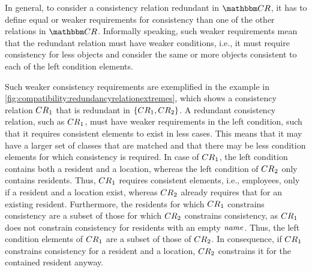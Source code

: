 In general, to consider a consistency relation redundant in $\consistencyrelationset{CR}$, it has to define equal or weaker requirements for consistency than one of the other relations in $\consistencyrelationset{CR}$.
Informally speaking, such weaker requirements mean that the redundant relation must have weaker conditions, i.e., it must require consistency for less objects and consider the same or more objects consistent to each of the left condition elements. 

\begin{example}
Such weaker consistency requirements are exemplified in the example in \autoref{fig:compatibility:redundancyrelationextremes}, which shows a consistency relation $\consistencyrelation{CR}{1}$ that is redundant in $\setted{\consistencyrelation{CR}{1}, \consistencyrelation{CR}{2}}$.
A redundant consistency relation, such as $\consistencyrelation{CR}{1}$, must have weaker requirements in the left condition, such that it requires consistent elements to exist in less cases.
This means that it may have a larger set of classes that are matched and that there may be less condition elements for which consistency is required.
In case of $\consistencyrelation{CR}{1}$, the left condition contains both a resident and a location, whereas the left condition of $\consistencyrelation{CR}{2}$ only contains residents.
Thus, $\consistencyrelation{CR}{1}$ requires consistent elements, i.e., employees, only if a resident and a location exist, whereas $\consistencyrelation{CR}{2}$ already requires that for an existing resident.
Furthermore, the residents for which $\consistencyrelation{CR}{1}$ constrains consistency are a subset of those for which $\consistencyrelation{CR}{2}$ constrains consistency, as $\consistencyrelation{CR}{1}$ does not constrain consistency for residents with an empty $\mathit{name}$.
Thus, the left condition elements of $\consistencyrelation{CR}{1}$ are a subset of those of $\consistencyrelation{CR}{2}$.
In consequence, if $\consistencyrelation{CR}{1}$ constrains consistency for a resident and a location, $\consistencyrelation{CR}{2}$ constrains it for the contained resident anyway.


\end{example}
